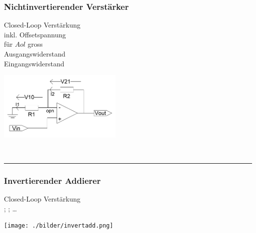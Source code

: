 	\subsubsection{Nichtinvertierender Verstärker}
		\begin{minipage}[T]{13cm}
      Closed-Loop Verst\"arkung
      \hspace{3mm}\\
      inkl. Offsetspannung
      \hspace{10.2mm}\\
      f\"ur $A{ol}$ gross
      \hspace{22mm}\\
      Ausgangswiderstand    \hspace{10.5mm}\\
      Eingangswiderstand    \hspace{11mm}\\
    \end{minipage}
		\begin{minipage}{6cm}
      \includegraphics[width=6cm]{./bilder/ni-verstaerker.png}
    \end{minipage}\\
\hrule

  \subsubsection{Invertierender Addierer}
    \begin{minipage}[T]{13cm}
      Closed-Loop Verst\"arkung
      \hspace{3mm}\\
      \hspace*{43mm}
      ;\hspace{0.2mm} 
      ; \ldots
    \end{minipage}
    \begin{minipage}{6cm}
      \texttt{[image: ./bilder/invertadd.png]}
    \end{minipage}\\
  
